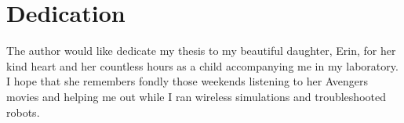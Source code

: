 \chapter*{Dedication}
The author would like dedicate my thesis to my beautiful daughter, Erin, for her
kind heart and her countless hours as a child accompanying me in my laboratory. I hope that she
remembers fondly those weekends listening to her Avengers movies and helping me out while I ran wireless simulations and troubleshooted robots.

